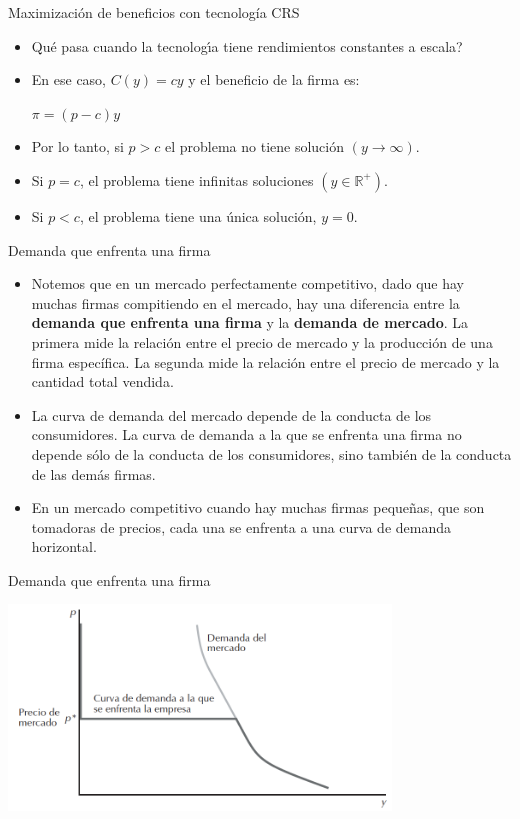 \documentclass{beamer}
\theoremstyle{definition}
\begin{document}
\begin{frame}{Maximización de beneficios con tecnología CRS}
\begin{itemize}
\item \textquestiondown Qu\'{e} pasa cuando la tecnolog\'{\i}a tiene rendimientos
constantes a escala? 
\item En ese caso, $C(y)=cy$ y el beneficio de la firma es:
\begin{center}
$\pi =(p-c)y$
\end{center}
\item Por lo tanto, si $p>c$ el problema no tiene soluci\'{o}n $(y\rightarrow
\infty)$.
\item Si $p=c$, el problema tiene infinitas soluciones $(y\in \mathbb{R}^{+})$.
\item Si $p<c$, el problema tiene una \'{u}nica soluci\'{o}n, $y=0$.
\end{itemize}
\end{frame}


\begin{solucion}
\begin{frame}{Demanda que enfrenta una firma}
\begin{itemize}
\item Notemos que en un mercado perfectamente competitivo, dado que hay muchas firmas compitiendo en el mercado, hay una diferencia entre la \textbf{demanda que enfrenta una firma} y la \textbf{demanda de mercado}. La primera mide la relación entre el precio de mercado y la producción de una firma específica. La segunda mide la relación entre el precio de mercado y la cantidad total vendida.
\item La curva de demanda del mercado depende de la conducta de los consumidores. La
curva de demanda a la que se enfrenta una firma no depende sólo de la conducta de
los consumidores, sino también de la conducta de las demás firmas. 
\item En un mercado competitivo cuando hay muchas firmas pequeñas, que son tomadoras de precios,
cada una se enfrenta a una curva de demanda horizontal.
\end{itemize}
\end{frame}

\begin{frame}{Demanda que enfrenta una firma}
	\begin{center}
\includegraphics[width=4in]{figures4/demanda.png}
\end{center}
\end{frame}
\end{solucion}
\end{document}
